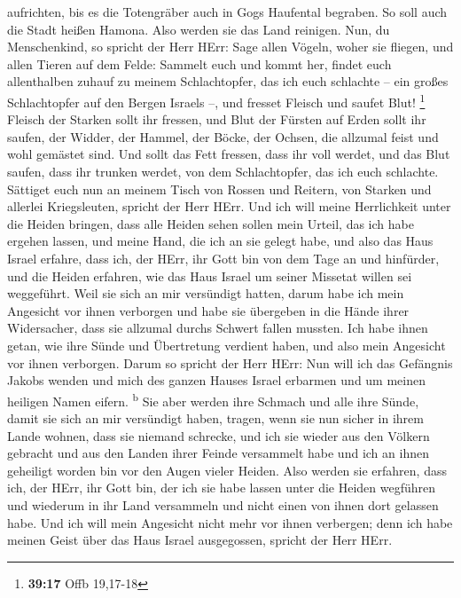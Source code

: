 aufrichten, bis es die Totengräber auch in Gogs Haufental begraben.
 So soll auch die Stadt heißen Hamona. Also werden sie
das Land reinigen.  Nun, du Menschenkind, so spricht der
Herr HErr: Sage allen Vögeln, woher sie fliegen, und allen Tieren auf
dem Felde: Sammelt euch und kommt her, findet euch allenthalben zuhauf
zu meinem Schlachtopfer, das ich euch schlachte -- ein großes
Schlachtopfer auf den Bergen Israels --, und fresset Fleisch und saufet
Blut! \footnote{\textbf{39:17} Offb 19,17-18}  Fleisch
der Starken sollt ihr fressen, und Blut der Fürsten auf Erden sollt ihr
saufen, der Widder, der Hammel, der Böcke, der Ochsen, die allzumal
feist und wohl gemästet sind.  Und sollt das Fett
fressen, dass ihr voll werdet, und das Blut saufen, dass ihr trunken
werdet, von dem Schlachtopfer, das ich euch schlachte. 
Sättiget euch nun an meinem Tisch von Rossen und Reitern, von Starken
und allerlei Kriegsleuten, spricht der Herr HErr.  Und
ich will meine Herrlichkeit unter die Heiden bringen, dass alle Heiden
sehen sollen mein Urteil, das ich habe ergehen lassen, und meine Hand,
die ich an sie gelegt habe,  und also das Haus Israel
erfahre, dass ich, der HErr, ihr Gott bin von dem Tage an und hinfürder,
 und die Heiden erfahren, wie das Haus Israel um seiner
Missetat willen sei weggeführt. Weil sie sich an mir versündigt hatten,
darum habe ich mein Angesicht vor ihnen verborgen und habe sie übergeben
in die Hände ihrer Widersacher, dass sie allzumal durchs Schwert fallen
mussten.  Ich habe ihnen getan, wie ihre Sünde und
Übertretung verdient haben, und also mein Angesicht vor ihnen verborgen.
 Darum so spricht der Herr HErr: Nun will ich das
Gefängnis Jakobs wenden und mich des ganzen Hauses Israel erbarmen und
um meinen heiligen Namen eifern. \textsuperscript{b}  Sie
aber werden ihre Schmach und alle ihre Sünde, damit sie sich an mir
versündigt haben, tragen, wenn sie nun sicher in ihrem Lande wohnen,
dass sie niemand schrecke,  und ich sie wieder aus den
Völkern gebracht und aus den Landen ihrer Feinde versammelt habe und ich
an ihnen geheiligt worden bin vor den Augen vieler Heiden.
 Also werden sie erfahren, dass ich, der HErr, ihr Gott
bin, der ich sie habe lassen unter die Heiden wegführen und wiederum in
ihr Land versammeln und nicht einen von ihnen dort gelassen habe.
 Und ich will mein Angesicht nicht mehr vor ihnen
verbergen; denn ich habe meinen Geist über das Haus Israel ausgegossen,
spricht der Herr HErr.

